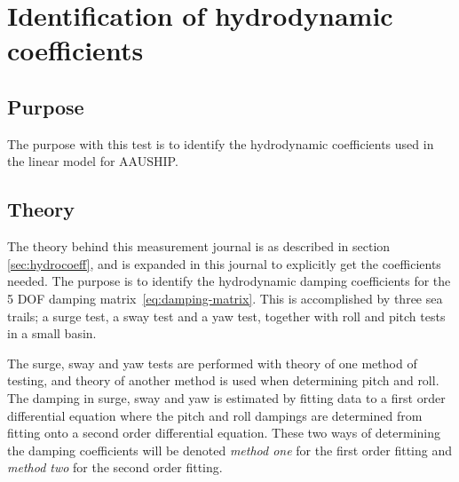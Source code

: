 \chapter{Identification of hydrodynamic coefficients}
\label{app:damping}

\section{Purpose}
The purpose with this test is to
identify the hydrodynamic coefficients used in the linear model for
AAUSHIP.

\section{Theory} The theory behind this measurement journal is as
described in section \ref{sec:hydrocoeff}, and is expanded in this
journal to explicitly get the coefficients needed. The purpose is to
identify the hydrodynamic damping coefficients for the 5 \ac{DOF} damping
matrix~\vref{eq:damping-matrix}. This is accomplished by
three sea trails; a surge test, a sway test and a yaw
test, together with roll and pitch tests in a small basin.




The surge, sway and yaw tests are performed with theory of one method of testing, and theory of another method is used when determining pitch and roll. The damping in surge, sway and yaw is estimated by fitting data to a first order differential equation where the pitch and roll dampings are determined from fitting onto a second order differential equation. These two ways of determining the damping coefficients will be denoted \textit{method one} for the first order fitting and \textit{method two} for the second order fitting.

